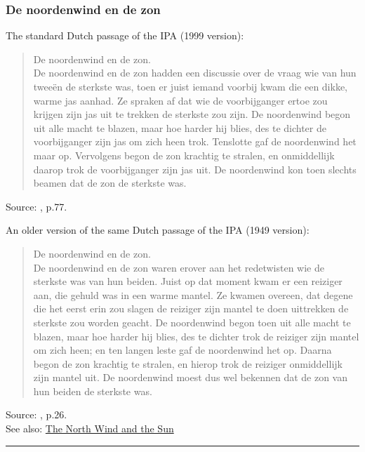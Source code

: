 \documentclass[
]{book}
\begin{document}
\subsubsection{De noordenwind en de zon}\label{de-noordenwind-en-de-zon}

The standard Dutch passage of the IPA (1999 version):

\begin{quote}
De noordenwind en de zon.\\
De noordenwind en de zon hadden een discussie over de vraag wie van hun tweeën de sterkste was, toen er juist iemand voorbij kwam die een dikke, warme jas aanhad. Ze spraken af dat wie de voorbijganger ertoe zou krijgen zijn jas uit te trekken de sterkste zou zijn. De noordenwind begon uit alle macht te blazen, maar hoe harder hij blies, des te dichter de voorbijganger zijn jas om zich heen trok. Tenslotte gaf de noordenwind het maar op. Vervolgens begon de zon krachtig te stralen, en onmiddellijk daarop trok de voorbijganger zijn jas uit. De noordenwind kon toen slechts beamen dat de zon de sterkste was.
\end{quote}

Source: \citet{HandbookIPA_1999}, p.77.

An older version of the same Dutch passage of the IPA (1949 version):

\begin{quote}
De noordenwind en de zon.\\
De noordenwind en de zon waren erover aan het redetwisten wie de sterkste was van hun beiden.
Juist op dat moment kwam er een reiziger aan, die gehuld was in een warme mantel.
Ze kwamen overeen, dat degene die het eerst erin zou slagen de reiziger zijn mantel te doen uittrekken de sterkste zou worden geacht.
De noordenwind begon toen uit alle macht te blazen, maar hoe harder hij blies, des te dichter trok de reiziger zijn mantel om zich heen; en ten langen leste gaf de noordenwind het op.
Daarna begon de zon krachtig te stralen, en hierop trok de reiziger onmiddellijk zijn mantel uit.
De noordenwind moest dus wel bekennen dat de zon van hun beiden de sterkste was.
\end{quote}

Source: \citet{InternationalPhoneticAssociation_1949}, p.26.\\
See also: \href{https://en.wikipedia.org/wiki/The_North_Wind_and_the_Sun}{The North Wind and the Sun}

\begin{center}\rule{0.5\linewidth}{0.5pt}\end{center}
\end{document}
